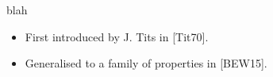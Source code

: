\documentclass[preview]{standalone}
\begin{document}
\begin{center}
blah\begin{itemize} \item First introduced by J. Tits in [Tit70].\item Generalised to a family of properties in [BEW15]. \end{itemize}
\end{center}
\end{document}
